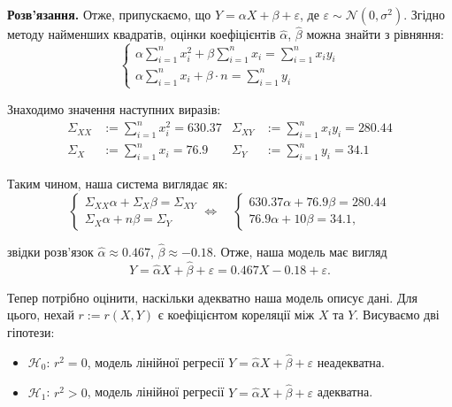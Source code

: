 \documentclass{../hw_template}
\begin{document}
\textbf{Розв'язання.} Отже, припускаємо, що $Y=\alpha X + \beta + \varepsilon$,
де $\varepsilon \sim \mathcal{N}(0,\sigma^2)$. Згідно методу найменших
квадратів, оцінки коефіцієнтів $\hat{\alpha}$, $\hat{\beta}$ можна знайти з
рівняння:
\begin{equation*}
    \begin{cases}
        \alpha \sum_{i=1}^n x_i^2 + \beta\sum_{i=1}^n x_i = \sum_{i=1}^n x_iy_i \\
        \alpha \sum_{i=1}^n x_i + \beta \cdot n = \sum_{i=1}^n y_i
    \end{cases}
\end{equation*}

Знаходимо значення наступних виразів: 
\begin{align*}
    \Sigma_{XX} &:= \sum_{i=1}^n x_i^2 = 630.37 & \Sigma_{XY} &:= \sum_{i=1}^n x_iy_i = 280.44 \\
    \Sigma_X &:= \sum_{i=1}^n x_i = 76.9 & \Sigma_Y &:= \sum_{i=1}^n y_i = 34.1
\end{align*}

Таким чином, наша система виглядає як:
\begin{equation*}
    \begin{cases}
        \Sigma_{XX}\alpha + \Sigma_X\beta = \Sigma_{XY} \\
        \Sigma_X\alpha + n\beta = \Sigma_Y
    \end{cases} \iff \quad \begin{cases}
        630.37\alpha + 76.9\beta = 280.44 \\
        76.9\alpha + 10\beta = 34.1,
    \end{cases}
\end{equation*}

звідки розв'язок $\hat{\alpha} \approx 0.467$, $\hat{\beta} \approx -0.18$. Отже, наша модель має вигляд
\begin{equation*}
    \boxed{Y = \hat{\alpha}X + \hat{\beta} + \varepsilon = 0.467X - 0.18 + \varepsilon}.
\end{equation*}

Тепер потрібно оцінити, наскільки адекватно наша модель описує дані. Для цього, нехай $r := r(X,Y)$ є коефіцієнтом кореляції між $X$ та $Y$. Висуваємо дві гіпотези:
\begin{itemize}
    \item $\mathcal{H}_0$: $r^2=0$, модель лінійної регресії $Y = \hat{\alpha}X + \hat{\beta} + \varepsilon$ неадекватна.
    \item $\mathcal{H}_1$: $r^2 > 0$, модель лінійної регресії $Y = \hat{\alpha}X + \hat{\beta} + \varepsilon$ адекватна.
\end{itemize}
\end{document}
